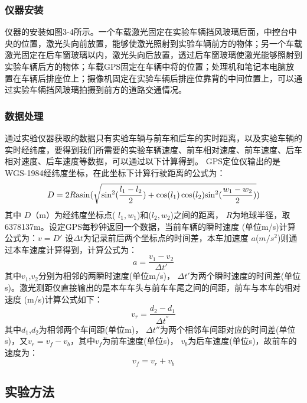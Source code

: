 \subsubsection{仪器安装}
仪器的安装如图3-4所示。一个车载激光固定在实验车辆挡风玻璃后面，中控台中央的位置，激光头向前放置，能够使激光照射到实验车辆前方的物体；另一个车载激光固定在后车窗玻璃以内，激光头向后放置，透过后车窗玻璃使激光能够照射到实验车辆后方的物体；车载GPS固定在车辆中将的位置；处理机和笔记本电脑放置在车辆后排座位上；摄像机固定在实验车辆后排座位靠背的中间位置上，可以通过实验车辆挡风玻璃拍摄到前方的道路交通情况。

\subsubsection{数据处理}
通过实验仪器获取的数据只有实验车辆与前车和后车的实时距离，以及实验车辆的实时经纬度，要得到我们所需要的实验车辆速度、前车相对速度、前车速度、后车相对速度、后车速度等数据，可以通过以下计算得到。
GPS定位仪输出的是WGS-1984经纬度坐标，在此坐标下计算行驶距离的公式为：
\begin{equation}
D = 2R{\rm{asin}}(\sqrt {\sin _{}^2(\frac{{{l_1} - {l_2}}}{2}) + \cos ({l_1})\cos ({l_2}){{\sin }^2}(\frac{{{w_1} - {w_2}}}{2})} )
\end{equation}
其中 $D$（m）为经纬度坐标点( ${l_1},{w_1}$)和(${l_2},{w_2}$)之间的距离， $R$为地球半径，取6378137m。设定GPS每秒钟返回一个数据，当前车辆的瞬时速度 (单位m/s)计算公式为：$v = D'$
设$\Delta t$为记录前后两个坐标点的时间差，本车加速度 $a$($m/s^2$)则通过本车速度计算得到，计算公式为：
\begin{equation}
a = \frac{{{v_1} - {v_2}}}{{\Delta t'}}
\end{equation}
其中$v_1$,$v_2$分别为相邻的两瞬时速度(单位m/s)， $\Delta {t'}$为两个瞬时速度的时间差(单位s)。激光测距仪直接输出的是本车车头与前车车尾之间的间距，前车与本车的相对速度 (m/s)计算公式如下：
\begin{equation}
{v_r} = \frac{{{d_2} - {d_1}}}{{\Delta {t^{''}}}}
\end{equation}
其中$d_1$,$d_2$为相邻两个车间距(单位m)， $\Delta t''$为两个相邻车间距对应的时间差(单位s)，又${v_r} = {v_f} - {v_b}$，其中${v_f}$为前车速度(单位s)， ${v_b}$为后车速度(单位s)，故前车的速度为：
\begin{equation}
{v_f} = {v_r} + {v_b}
\end{equation}

\subsection{实验方法}
